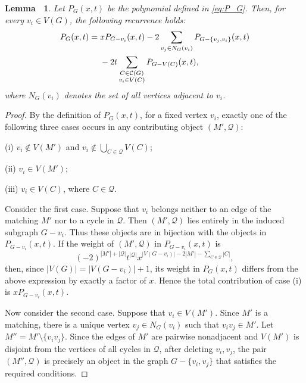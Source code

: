 \documentclass[11pt, a4paper]{article}
\theoremstyle{plain}
\newtheorem{lemma}{Lemma\ }[section]
\begin{document}
\begin{lemma}\label{lem:vertex-recurrence}
Let $P_G(x,t)$ be the polynomial defined in \eqref{eq:P_G}.
Then, for every $v_i\in V(G)$, the following recurrence holds:
\begin{align}\label{eq:vertex-recurrence}
 P_G(x,t)
 ={}&xP_{G-v_i}(x,t)
      -2\sum_{v_j\in N_G(v_i)}P_{G-\{v_j,v_i\}}(x,t)
    \notag\\
    &-2t\sum_{\substack{C\in\mathcal{C}(G)\\v_i\in V(C)}}
                   P_{G-V(C)}(x,t),
\end{align}
where $N_G(v_i)$ denotes the set of all vertices adjacent to $v_i$.
\end{lemma}
\begin{proof}
By the definition of $P_G(x,t)$, for a fixed vertex $v_i$,
exactly one of the following three cases occurs in any contributing object $(M',\mathcal{Q})$:

(i) $v_i\notin V(M')$ and $v_i\notin\bigcup_{C\in\mathcal{Q}}V(C)$;

(ii) $v_i\in V(M')$;

(iii) $v_i\in V(C)$, where $C\in \mathcal{Q}$.

Consider the first case. Suppose that $v_i$ belongs neither to an edge of the matching $M'$
nor to a cycle in $\mathcal{Q}$.
Then $(M',\mathcal{Q})$ lies entirely in the induced subgraph $G-v_i$.
Thus these objects are in bijection with the objects in $P_{G-v_i}(x,t)$.
If the weight of $(M',\mathcal{Q})$ in $P_{G-v_i}(x,t)$ is
\[
(-2)^{|M'|+|\mathcal{Q}|}t^{|\mathcal{Q}|}
 x^{|V(G-v_i)|-2|M'|-\sum_{C\in \mathcal{Q}}|C|},
\]
then, since $|V(G)|=|V(G-v_i)|+1$,
its weight in $P_G(x,t)$ differs from the above expression by exactly a factor of $x$.
Hence the total contribution of case (i) is $xP_{G-v_i}(x,t)$.

Now consider the second case.
Suppose that $v_i\in V(M')$. Since $M'$ is a matching, there is a unique vertex
$v_j\in N_G(v_i)$ such that $v_iv_j\in M'$. Let
$M''=M'\setminus\{v_iv_j\}$.
Since the edges of $M'$ are pairwise nonadjacent and $V(M')$ is disjoint from the vertices of all cycles in $\mathcal{Q}$,
after deleting $v_i,v_j$, the pair $(M'',\mathcal{Q})$ is precisely an object in the graph
$G-\{v_i,v_j\}$ that satisfies the required conditions.


\end{proof}
\end{document}
